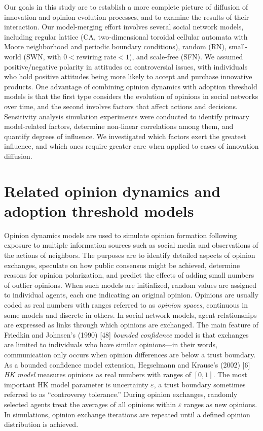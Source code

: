 \documentclass[10pt,letterpaper]{article}
\begin{document}
Our goals in this study are to establish a more complete picture of diffusion of innovation and opinion evolution processes, and to examine the results of their interaction. Our model-merging effort involves several social network models, including regular lattice (CA, two-dimensional toroidal cellular automata with Moore neighborhood and periodic boundary conditions), random (RN), small-world (SWN, with $0 < \text{rewiring rate} < 1$), and scale-free (SFN). We assumed positive/negative polarity in attitudes on controversial issues, with individuals who hold positive attitudes being more likely to accept and purchase innovative products. One advantage of combining opinion dynamics with adoption threshold models is that the first type considers the evolution of opinions in social networks over time, and the second involves factors that affect actions and decisions. Sensitivity analysis simulation experiments were conducted to identify primary model-related factors, determine non-linear correlations among them, and quantify degrees of influence. We investigated which factors exert the greatest influence, and which ones require greater care when applied to cases of innovation diffusion.


\section*{Related opinion dynamics and adoption threshold models}

Opinion dynamics models are used to simulate opinion formation following exposure to multiple information sources such as social media and observations of the actions of neighbors. The purposes are to identify detailed aspects of opinion exchanges, speculate on how public consensus might be achieved, determine reasons for opinion polarization, and predict the effects of adding small numbers of outlier opinions. When such models are initialized, random values are assigned to individual agents, each one indicating an original opinion. Opinions are usually coded as real numbers with ranges referred to as \textit{opinion spaces}, continuous in some models and discrete in others. In social network models, agent relationships are expressed as links through which opinions are exchanged. The main feature of Friedkin and Johnsen's (1990) [48] \textit{bounded confidence} model is that exchanges are limited to individuals who have similar opinions---in their words, communication only occurs when opinion differences are below a trust boundary. As a bounded confidence model extension, Hegselmann and Krause's (2002) [6] \textit{HK model} measures opinions as real numbers with ranges of $[0, 1]$. The most important HK model parameter is uncertainty $\varepsilon$, a trust boundary sometimes referred to as ``controversy tolerance.'' During opinion exchanges, randomly selected agents treat the averages of all opinions within $\varepsilon$ ranges as new opinions. In simulations, opinion exchange iterations are repeated until a defined opinion distribution is achieved.
\end{document}
